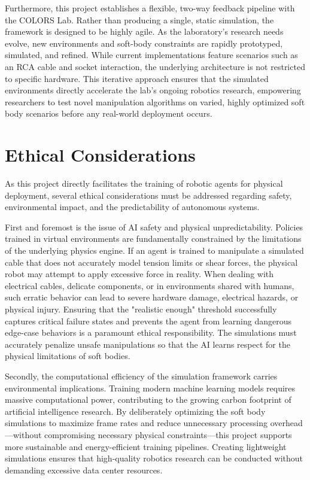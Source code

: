 \documentclass[a4paper,12pt]{report}
\begin{document}
Furthermore, this project establishes a flexible, two-way feedback pipeline with the COLORS Lab. Rather than producing a single, static simulation, the framework is designed to be highly agile. As the laboratory's research needs evolve, new environments and soft-body constraints are rapidly prototyped, simulated, and refined. While current implementations feature scenarios such as an RCA cable and socket interaction, the underlying architecture is not restricted to specific hardware. This iterative approach ensures that the simulated environments directly accelerate the lab's ongoing robotics research, empowering researchers to test novel manipulation algorithms on varied, highly optimized soft body scenarios before any real-world deployment occurs.

\section{Ethical Considerations}
As this project directly facilitates the training of robotic agents for physical deployment, several ethical considerations must be addressed regarding safety, environmental impact, and the predictability of autonomous systems.

First and foremost is the issue of AI safety and physical unpredictability. Policies trained in virtual environments are fundamentally constrained by the limitations of the underlying physics engine. If an agent is trained to manipulate a simulated cable that does not accurately model tension limits or shear forces, the physical robot may attempt to apply excessive force in reality. When dealing with electrical cables, delicate components, or in environments shared with humans, such erratic behavior can lead to severe hardware damage, electrical hazards, or physical injury. Ensuring that the "realistic enough" threshold successfully captures critical failure states and prevents the agent from learning dangerous edge-case behaviors is a paramount ethical responsibility. The simulations must accurately penalize unsafe manipulations so that the AI learns respect for the physical limitations of soft bodies.

Secondly, the computational efficiency of the simulation framework carries environmental implications. Training modern machine learning models requires massive computational power, contributing to the growing carbon footprint of artificial intelligence research. By deliberately optimizing the soft body simulations to maximize frame rates and reduce unnecessary processing overhead—without compromising necessary physical constraints—this project supports more sustainable and energy-efficient training pipelines. Creating lightweight simulations ensures that high-quality robotics research can be conducted without demanding excessive data center resources.
\end{document}

